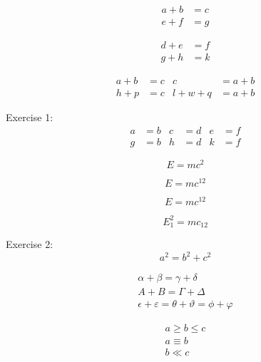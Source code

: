 \documentclass[letterpaper, notitlepage, 12pt]{article}
\begin{document}
\begin{equation}
\label{twoEquations}
\begin{split}
a+b&=c\\  %
e+f&=g
\end{split}
\end{equation}

\begin{align}
\label{equation1}
d+e&=f\\
\label{equation2}
g+h&=k
\end{align}

\begin{align}
\label{equation3}
a+b&=c & c&=a+b\\
\label{equation4}
h+p&=c & l+w+q&=a+b
\end{align}

Exercise 1:
\begin{align} %
\label{equation5}
a&=b & c&=d & e&=f\\
\label{equation6}
g&=b & h&=d & k&=f
\end{align}

\begin{equation}
E=mc^2
\end{equation}

\begin{equation}
E=mc^12
\end{equation}

\[E=mc^{12}\]

\begin{equation}
E_1^2=mc_{12} 
\end{equation}

Exercise 2:
\begin{equation}
a^2=b^2+c^2
\end{equation}

\begin{equation}
\begin{split}
\alpha + \beta = \gamma + \delta\\
A + B = \Gamma + \Delta\\
\epsilon + \varepsilon = \theta + \vartheta = \phi + \varphi
\end{split}
\end{equation}

\begin{equation}
\begin{split}
a \ge b \le c \\
a \equiv b\\
b \ll c
\end{split}
\end{equation}
\end{document}
